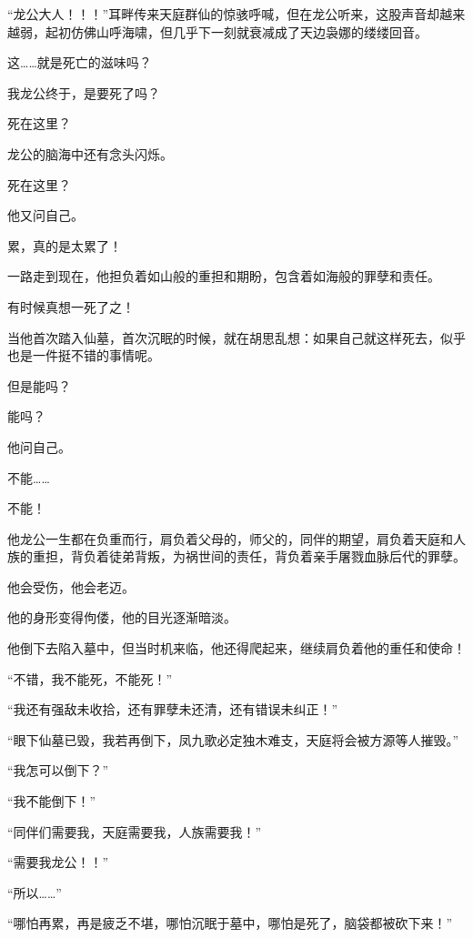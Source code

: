 
\begin{this_body}



“龙公大人！！！”耳畔传来天庭群仙的惊骇呼喊，但在龙公听来，这股声音却越来越弱，起初仿佛山呼海啸，但几乎下一刻就衰减成了天边袅娜的缕缕回音。

这……就是死亡的滋味吗？

我龙公终于，是要死了吗？

死在这里？

龙公的脑海中还有念头闪烁。

死在这里？

他又问自己。

累，真的是太累了！

一路走到现在，他担负着如山般的重担和期盼，包含着如海般的罪孽和责任。

有时候真想一死了之！

当他首次踏入仙墓，首次沉眠的时候，就在胡思乱想：如果自己就这样死去，似乎也是一件挺不错的事情呢。

但是能吗？

能吗？

他问自己。

不能……

不能！

他龙公一生都在负重而行，肩负着父母的，师父的，同伴的期望，肩负着天庭和人族的重担，背负着徒弟背叛，为祸世间的责任，背负着亲手屠戮血脉后代的罪孽。

他会受伤，他会老迈。

他的身形变得佝偻，他的目光逐渐暗淡。

他倒下去陷入墓中，但当时机来临，他还得爬起来，继续肩负着他的重任和使命！

“不错，我不能死，不能死！”

“我还有强敌未收拾，还有罪孽未还清，还有错误未纠正！”

“眼下仙墓已毁，我若再倒下，凤九歌必定独木难支，天庭将会被方源等人摧毁。”

“我怎可以倒下？”

“我不能倒下！”

“同伴们需要我，天庭需要我，人族需要我！”

“需要我龙公！！”

“所以……”

“哪怕再累，再是疲乏不堪，哪怕沉眠于墓中，哪怕是死了，脑袋都被砍下来！”


\end{this_body}
